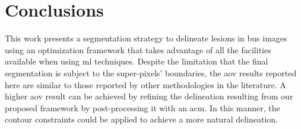 \documentclass[10pt,twocolumn,letterpaper]{article}
\begin{document}
\section{Conclusions}
This work presents a segmentation strategy to delineate lesions in \ac{bus} images using an optimization framework that takes advantage of all the facilities available when using \ac{ml} techniques.
Despite the limitation that the final segmentation is subject to the super-pixels' boundaries, the \ac{aov} results reported here are similar to those reported by other methodologies in the literature.
A higher \ac{aov} result can be achieved by refining the delineation resulting from our proposed framework by post-processing it with an \ac{acm}. In this manner, the contour constraints could be applied to achieve a more natural delineation.

{\small 
\printbibliography                                                                                                                     }
\end{document}
